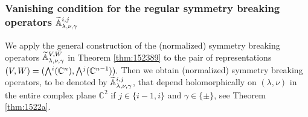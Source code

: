 \subsubsection{Vanishing condition
 for the regular symmetry breaking operators 
 ${\widetilde{\mathbb{A}}}_{{\lambda},{\nu},{\gamma}}^{{i,j}}$}
\label{subsec:Aijvanish}

We apply the general construction
 of the (normalized) symmetry breaking operators
 ${\widetilde{\mathbb{A}}}_{{\lambda},{\nu},{\gamma}}^{{V,W}}$
 in Theorem \ref{thm:152389}
 to the pair
 of representations
$
  (V,W)=(\Exterior^i({\mathbb{C}}^{n}), \Exterior^j({\mathbb{C}}^{n-1})).  
$  
Then we obtain (normalized) symmetry breaking operators, 
 to be denoted by 
 ${\widetilde{\mathbb{A}}}_{{\lambda},{\nu},{\gamma}}^{{i,j}}$, 
that depend holomorphically on $(\lambda,\nu)$
 in the entire complex plane ${\mathbb{C}}^2$
 if $j \in \{i-1,i\}$
 and $\gamma \in \{\pm\}$, 
 see Theorem \ref{thm:1522a}.  



